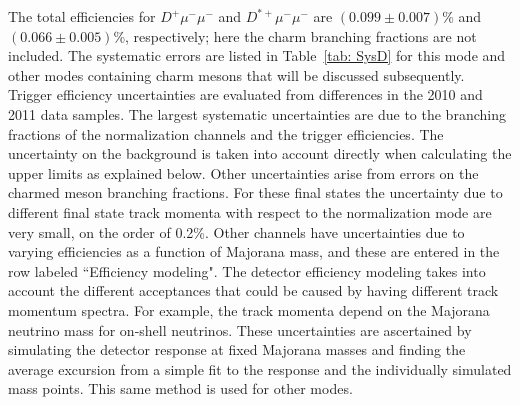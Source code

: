 \documentclass[12pt,a4paper]{article}
\begin{document}
 
The total efficiencies for $D^+\mu^-\mu^-$ and $D^{*+}\mu^-\mu^-$ are $(0.099\pm 0.007)$\% and $(0.066\pm 0.005)$\%, respectively; here the charm branching fractions are not included.
The systematic errors are listed in Table~\ref{tab: SysD} for this mode and other modes containing charm mesons that will be discussed subsequently. Trigger efficiency uncertainties are evaluated from differences in the 2010 and 2011 data samples. The largest systematic uncertainties are due to the branching fractions of the normalization channels and the trigger efficiencies. 
The uncertainty on the background is taken into account directly when calculating the upper limits as explained below. Other uncertainties arise from errors on the charmed meson branching fractions. For these final states the uncertainty due to different final state track momenta with respect to the normalization mode are very small, on the order of 0.2\%.
Other channels have uncertainties due to varying efficiencies as a function of Majorana mass, and these are entered in the row labeled ``Efficiency modeling". The detector efficiency modeling takes into account the different acceptances that could be caused by having different track momentum spectra. For example, the track momenta depend on the Majorana neutrino mass for on-shell neutrinos. 
These uncertainties are ascertained by simulating the detector response at fixed Majorana masses and finding the average excursion from a simple fit to the response and the individually simulated mass points. This same method is used for other modes.
\end{document}
